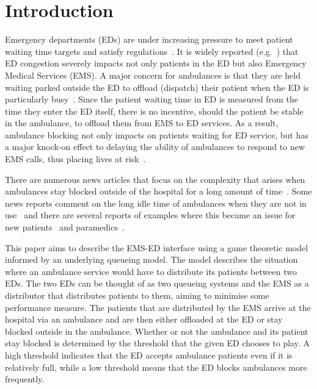 \section{Introduction}

Emergency departments (EDs) are under increasing pressure to meet patient
waiting time targets and satisfy 
regulations~\cite{EmergencyDepartmentWinterPressures}.
It is widely reported (e.g.~\cite{mirror, thenews, bmj}) that ED congestion 
severely impacts not only patients in the ED but also Emergency Medical 
Services (EMS).
A major concern for ambulances is that they are held waiting parked outside the
ED to offload (dispatch) their patient when the ED is particularly 
busy~\cite{clarey2014ambulance}. 
Since the patient waiting time in ED is measured from the time they enter the
ED itself, there is no incentive, should the patient be stable in the
ambulance, to offload them from EMS to ED services.
As a result, ambulance blocking not only impacts on patients waiting for ED
service, but has a major knock-on effect to delaying the ability of ambulances
to respond to new EMS calls, thus placing lives at risk~\cite{eastanglia}.

There are numerous news articles that focus on the complexity that arises when
ambulances stay blocked outside of the hospital for a long amount of 
time~\cite{dailyrecords, staffordshirelive}.
Some news reports comment on the long idle time of ambulances when
they are not in use~\cite{herefordtimes} and there are several reports of 
examples where this became an issue for new patients~\cite{southwalesargus}
and paramedics~\cite{bbcwales}.

This paper aims to describe the EMS-ED interface using a game theoretic model
informed by an underlying queueing model.
The model describes the situation where an ambulance service would
have to distribute its patients between two EDs.
The two EDs can be thought of as two queueing systems and the EMS as a 
distributor that distributes patients to them, aiming to minimise some
performance measure.
The patients that are distributed by the EMS arrive at the hospital via an 
ambulance and are then either offloaded at the ED or stay blocked outside in 
the ambulance.
Whether or not the ambulance and its patient stay blocked is determined by 
the threshold that the given ED chooses to play.
A high threshold indicates that the ED accepts ambulance patients even if it is 
relatively full, while a low threshold means that the ED blocks ambulances more 
frequently.

